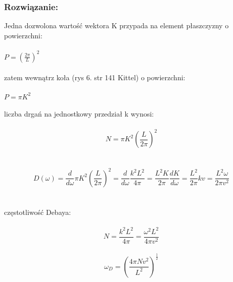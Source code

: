 \subsubsection*{Rozwiązanie:}
Jedna dozwolona wartość wektora K przypada na element płaszczyzny o powierzchni:
\\
\\
$P=(\frac{2\pi}{L})^2$
\\
\\
zatem wewnątrz koła (rys 6. str 141 Kittel) o powierzchni:
\\
\\
$P=\pi K^2$
\\
\\
liczba drgań na jednostkowy przedział k wynosi:
\\
\\
\begin{equation}
N=\pi K^2(\frac{L}{2\pi})^2
\end{equation}
\\
\\
\begin{equation}
D(\omega)=\frac{d}{d\omega} \pi K^2(\frac{L}{2\pi})^2=\frac{d}{d\omega}\frac{k^2L^2}{4\pi}=\frac{L^2K}{2\pi}\frac{dK}{d\omega}=\frac{L^2}{2\pi}kv=\frac{L^2\omega}{2\pi v^2}
\end{equation}
\\
\\
częstotliwość Debaya:
\\
\\
\begin {equation}
N=\frac{k^2L^2}{4\pi}=\frac{\omega^2L^2}{4\pi v^2}
\end{equation}
\\
\begin{equation}
\omega_D=(\frac{4\pi Nv^2}{L^2})^{\frac{1}{2}}
\end{equation}
